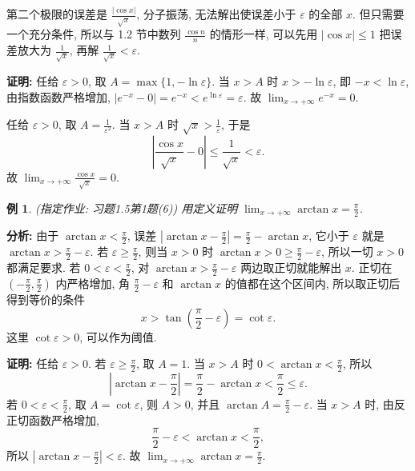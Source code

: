 \documentclass[UTF8,openany]{ctexbook}
\theoremstyle{chinesetextbook}
\newtheorem{example}{例}[section]
\newenvironment{cnproof}{\par\indent\textbf{证明:} \ignorespaces}{\par}
\begin{document}
第二个极限的误差是 $\displaystyle\frac{|\cos x|}{\sqrt x}$, 分子振荡, 无法解出使误差小于 $\varepsilon$ 的全部 $x$. 但只需要一个充分条件, 所以与 1.2 节中数列 $\displaystyle\frac{\cos n}n$ 的情形一样, 可以先用 $|\cos x|\le1$ 把误差放大为 $\displaystyle\frac1{\sqrt x}$, 再解 $\displaystyle\frac1{\sqrt x}<\varepsilon$.
\begin{cnproof}
任给 $\varepsilon>0$, 取 $A=\max\{1,-\ln\varepsilon\}$. 当 $x>A$ 时 $x>-\ln\varepsilon$, 即 $-x<\ln\varepsilon$, 由指数函数严格增加, $|e^{-x}-0|=e^{-x}<e^{\ln\varepsilon}=\varepsilon$. 故 $\displaystyle\lim_{x\to+\infty}e^{-x}=0$.

任给 $\varepsilon>0$, 取 $\displaystyle A=\frac1{\varepsilon^2}$. 当 $x>A$ 时 $\displaystyle\sqrt x>\frac1\varepsilon$, 于是
\[
\left|\frac{\cos x}{\sqrt x}-0\right|\le\frac1{\sqrt x}<\varepsilon.
\]
故 $\displaystyle\lim_{x\to+\infty}\frac{\cos x}{\sqrt x}=0$.
\end{cnproof}
\begin{example}\label{ex:h15-1-6}
\textnormal{(指定作业: 习题1.5第1题(6))} 用定义证明 $\displaystyle\lim_{x\to+\infty}\arctan x=\frac\pi2$.
\end{example}
\par\indent\textbf{分析:} 由于 $\displaystyle\arctan x<\frac\pi2$, 误差 $\displaystyle\left|\arctan x-\frac\pi2\right|=\frac\pi2-\arctan x$, 它小于 $\varepsilon$ 就是 $\displaystyle\arctan x>\frac\pi2-\varepsilon$. 若 $\displaystyle\varepsilon\ge\frac\pi2$, 则当 $x>0$ 时 $\displaystyle\arctan x>0\ge\frac\pi2-\varepsilon$, 所以一切 $x>0$ 都满足要求. 若 $\displaystyle0<\varepsilon<\frac\pi2$, 对 $\displaystyle\arctan x>\frac\pi2-\varepsilon$ 两边取正切就能解出 $x$. 正切在 $\displaystyle\left(-\frac\pi2,\frac\pi2\right)$ 内严格增加, 角 $\displaystyle\frac\pi2-\varepsilon$ 和 $\arctan x$ 的值都在这个区间内, 所以取正切后得到等价的条件
\[
x>\tan\left(\frac\pi2-\varepsilon\right)=\cot\varepsilon.
\]
这里 $\cot\varepsilon>0$, 可以作为阈值.
\begin{cnproof}
任给 $\varepsilon>0$. 若 $\displaystyle\varepsilon\ge\frac\pi2$, 取 $A=1$. 当 $x>A$ 时 $\displaystyle0<\arctan x<\frac\pi2$, 所以
\[
\left|\arctan x-\frac\pi2\right|=\frac\pi2-\arctan x<\frac\pi2\le\varepsilon.
\]
若 $\displaystyle0<\varepsilon<\frac\pi2$, 取 $A=\cot\varepsilon$, 则 $A>0$, 并且 $\displaystyle\arctan A=\frac\pi2-\varepsilon$. 当 $x>A$ 时, 由反正切函数严格增加,
\[
\frac\pi2-\varepsilon<\arctan x<\frac\pi2,
\]
所以 $\displaystyle\left|\arctan x-\frac\pi2\right|<\varepsilon$. 故 $\displaystyle\lim_{x\to+\infty}\arctan x=\frac\pi2$.
\end{cnproof}
\end{document}
